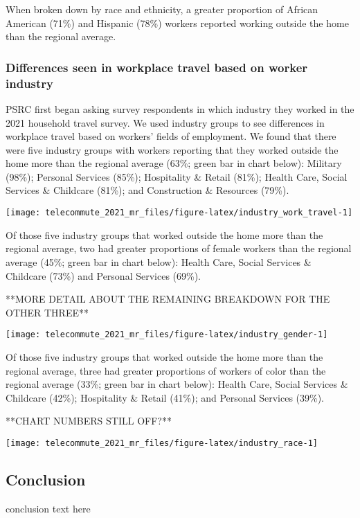 \documentclass[
  12pt,
]{article}
\begin{document}
\begin{flushleft}
When broken down by race and ethnicity, a greater proportion of African American (71\%) and Hispanic (78\%) workers reported working outside the home than the regional average.
\end{flushleft}

\hypertarget{differences-seen-in-workplace-travel-based-on-worker-industry}{%
\subsubsection{Differences seen in workplace travel based on worker
industry}\label{differences-seen-in-workplace-travel-based-on-worker-industry}}

\begin{flushleft}
PSRC first began asking survey respondents in which industry they worked in the 2021 household travel survey. We used industry groups to see differences in workplace travel based on workers' fields of employment. We found that there were five industry groups with workers reporting that they worked outside the home more than the regional average (63\%; green bar in chart below): Military (98\%); Personal Services (85\%); Hospitality \& Retail (81\%); Health Care, Social Services \& Childcare (81\%); and Construction \& Resources (79\%).
\end{flushleft}

\begin{center}\texttt{[image: telecommute\_2021\_mr\_files/figure-latex/industry\_work\_travel-1]} \end{center}

\begin{flushleft}
Of those five industry groups that worked outside the home more than the regional average, two had greater proportions of female workers than the regional average (45\%; green bar in chart below): Health Care, Social Services \& Childcare (73\%) and Personal Services (69\%).

**MORE DETAIL ABOUT THE REMAINING BREAKDOWN FOR THE OTHER THREE**

\end{flushleft}

\begin{center}\texttt{[image: telecommute\_2021\_mr\_files/figure-latex/industry\_gender-1]} \end{center}

\begin{flushleft}
Of those five industry groups that worked outside the home more than the regional average, three had greater proportions of workers of color than the regional average (33\%; green bar in chart below): Health Care, Social Services \& Childcare (42\%); Hospitality \& Retail (41\%); and Personal Services (39\%).

**CHART NUMBERS STILL OFF?**

\end{flushleft}

\begin{center}\texttt{[image: telecommute\_2021\_mr\_files/figure-latex/industry\_race-1]} \end{center}

\subsection{Conclusion}
\begin{flushleft}

conclusion text here

\end{flushleft}
\end{document}
